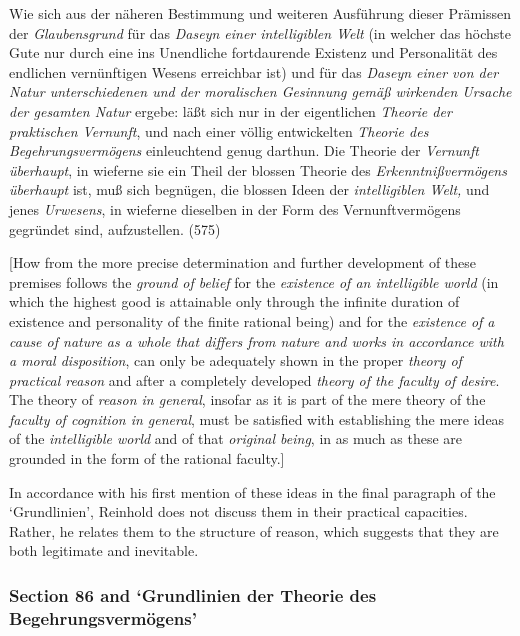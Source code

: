 Wie sich aus der n\"{a}heren Bestimmung und weiteren Ausf\"{u}hrung dieser Pr\"{a}missen der \textit{Glaubensgrund }f\"{u}r das \textit{Daseyn einer intelligiblen Welt} (in welcher das h\"{o}chste Gute nur durch eine ins Unendliche fortdaurende Existenz und Personalit\"{a}t des endlichen vern\"{u}nftigen Wesens erreichbar ist) und f\"{u}r das \textit{Daseyn einer von der Natur unterschiedenen und der moralischen Gesinnung gem\"{a}\ss{} wirkenden Ursache der gesamten Natur} ergebe: l\"{a}\ss{}t sich nur in der eigentlichen \textit{Theorie der praktischen Vernunft}, und nach einer v\"{o}llig entwickelten \textit{Theorie des Begehrungsverm\"{o}gens} einleuchtend genug darthun. Die Theorie der \textit{Vernunft \"{u}berhaupt}, in wieferne sie ein Theil der blossen Theorie des \textit{Erkenntni\ss{}verm\"{o}gens \"{u}berhaupt} ist, mu\ss{} sich begn\"{u}gen, die blossen Ideen der \textit{intelligiblen Welt,} und jenes \textit{Urwesens}, in wieferne dieselben in der Form des Vernunftverm\"{o}gens gegr\"{u}ndet sind, aufzustellen. (575) 

[How from the more precise determination and further development of these premises follows the \textit{ground of belief }for the \textit{existence of an intelligible world} (in which the highest good is attainable only through the infinite duration of existence and personality of the finite rational being) and for the \textit{existence of a cause of nature as a whole that differs from nature and works in accordance with a moral disposition}, can only be adequately shown in the proper \textit{theory of practical reason} and after a completely developed \textit{theory of the faculty of desire}. The theory of \textit{reason in general}, insofar as it is part of the mere theory of the \textit{faculty of cognition in general}, must be satisfied with establishing the mere ideas of the \textit{intelligible world} and of that \textit{original being}, in as much as these are grounded in the form of the rational faculty.] 

In accordance with his first mention of these ideas in the final paragraph of the `Grundlinien', Reinhold does not discuss them in their practical capacities. Rather, he relates them to the structure of reason, which suggests that they are both legitimate and inevitable.


\subsubsection{Section 86 and `Grundlinien der Theorie des Begehrungsverm\"{o}gens'}
\label{subsubsection:_Ref228718282}


